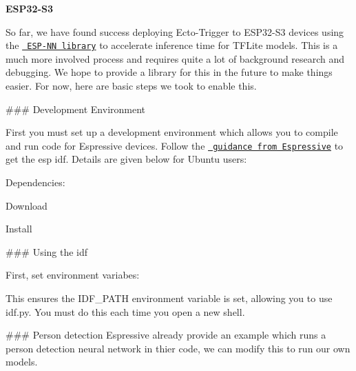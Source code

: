 {\bfseries{ESP32-\/\+S3}}\begin{adjustwidth}{1em}{0em}


So far, we have found success deploying Ecto-\/\+Trigger to ESP32-\/\+S3 devices using the \href{https://github.com/espressif/esp-nn}{\texttt{ ESP-\/\+NN library}} to accelerate inference time for TFLite models. This is a much more involved process and requires quite a lot of background research and debugging. We hope to provide a library for this in the future to make things easier. For now, here are basic steps we took to enable this.

\#\#\# Development Environment

First you must set up a development environment which allows you to compile and run code for Espressive devices. Follow the \href{https://docs.espressif.com/projects/esp-idf/en/stable/esp32s3/get-started/index.html}{\texttt{ guidance from Espressive}} to get the esp idf. Details are given below for Ubuntu users\+:

Dependencies\+:


\begin{DoxyCode}{0}

\end{DoxyCode}
 Download 
\begin{DoxyCode}{0}

\end{DoxyCode}
 Install 
\begin{DoxyCode}{0}

\end{DoxyCode}
 \#\#\# Using the idf

First, set environment variabes\+: 
\begin{DoxyCode}{0}

\end{DoxyCode}
 This ensures the {\ttfamily IDF\+\_\+\+PATH} environment variable is set, allowing you to use {\ttfamily idf.\+py}. You must do this each time you open a new shell.

\#\#\# Person detection Espressive already provide an example which runs a person detection neural network in thier code, we can modify this to run our own models.


\end{adjustwidth}
